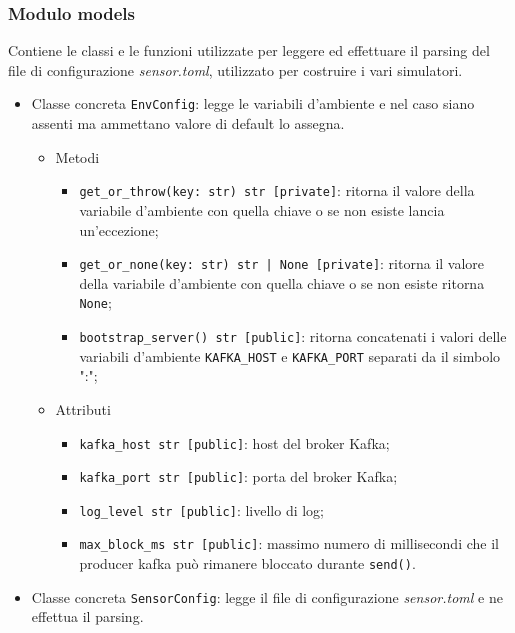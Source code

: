 \subsubsection{Modulo models}
Contiene le classi e le funzioni utilizzate per leggere ed effettuare il parsing del file di configurazione \textit{sensor.toml}, utilizzato per costruire i vari simulatori.
\begin{itemize}
	\item Classe concreta \texttt{EnvConfig}: legge le variabili d'ambiente e nel caso siano assenti ma ammettano valore di default lo assegna.
	      \begin{itemize}
		      \item Metodi
		            \begin{itemize}
			            \item \texttt{get\_or\_throw(key: str) str [private]}: ritorna il valore della variabile d'ambiente con quella chiave o se non esiste lancia un'eccezione;
			            \item \texttt{get\_or\_none(key: str) str | None [private]}: ritorna il valore della variabile d'ambiente con quella chiave o se non esiste ritorna \texttt{None};
			            \item \texttt{bootstrap\_server() str [public]}: ritorna concatenati i valori delle variabili d'ambiente \texttt{KAFKA\_HOST} e \texttt{KAFKA\_PORT} separati da il simbolo ":";
		            \end{itemize}
		      \item Attributi
		            \begin{itemize}
			            \item \texttt{kafka\_host str [public]}: host del broker Kafka;
			            \item \texttt{kafka\_port str [public]}: porta del broker Kafka;
			            \item \texttt{log\_level str [public]}: livello di log;
			            \item \texttt{max\_block\_ms str [public]}: massimo numero di millisecondi che il producer kafka può rimanere bloccato durante \texttt{send()}.
		            \end{itemize}
	      \end{itemize}
	\item Classe concreta \texttt{SensorConfig}: legge il file di configurazione \textit{sensor.toml} e ne effettua il parsing.

\end{itemize}
